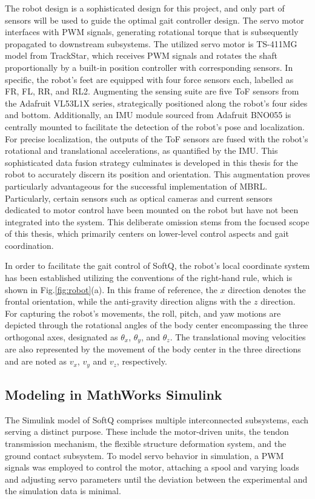 The robot design is a sophisticated design for this project, and only part of sensors will be used to guide the optimal gait controller design. The servo motor interfaces with \ac{PWM} signals, generating rotational torque  that is subsequently propagated to downstream subsystems. The utilized servo motor is TS-411MG model from TrackStar, which receives \ac{PWM} signals and rotates the shaft proportionally by a built-in position controller with corresponding sensors. In specific, the robot's feet are equipped with four force sensors each, labelled as \ac{FR}, \ac{FL}, \ac{RR}, and \ac{RL2}. Augmenting the sensing suite are five \ac{ToF} sensors from the Adafruit VL53L1X series, strategically positioned along the robot's four sides and bottom. Additionally, an \ac{IMU} module sourced from Adafruit BNO055 is centrally mounted to facilitate the detection of the robot's pose and localization. For precise localization, the outputs of the \ac{ToF} sensors are fused with the robot's rotational and translational accelerations, as quantified by the \ac{IMU}. This sophisticated data fusion strategy culminates is developed in this thesis for the robot to accurately discern its position and orientation. This augmentation proves particularly advantageous for the successful implementation of \ac{MBRL}. Particularly, certain sensors such as optical cameras and current sensors dedicated to motor control have been mounted on the robot but have not been integrated into the system. This deliberate omission stems from the focused scope of this thesis, which primarily centers on lower-level control aspects and gait coordination.

In order to facilitate the gait control of SoftQ, the robot's local coordinate system has been established utilizing the conventions of the right-hand rule, which is shown in Fig.\ref{fig:robot}(a). In this frame of reference, the $x$ direction denotes the frontal orientation, while the anti-gravity direction aligns with the $z$ direction. For capturing the robot's movements, the roll, pitch, and yaw motions are depicted through the rotational angles of the body center encompassing the three orthogonal axes, designated as $\theta_x$, $\theta_y$, and $\theta_z$. The translational moving velocities are also represented by the movement of the body center in the three directions and are noted as $v_x$, $v_y$ and $v_z$, respectively.

\subsection{Modeling in MathWorks Simulink\texorpdfstring{\textsuperscript{\textregistered}}{(R)}}
\label{sec3.2}
The Simulink model of SoftQ comprises multiple interconnected subsystems, each serving a distinct purpose. These include the motor-driven units, the tendon transmission mechanism, the flexible structure deformation system, and the ground contact subsystem. To model servo behavior in simulation, a \ac{PWM} signals was employed to control the motor, attaching a spool and varying loads and adjusting servo parameters until the deviation between the experimental and the simulation data is minimal. 

